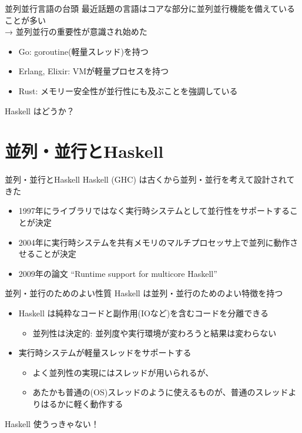 \documentclass[unicode,12pt]{beamer}
\begin{document}
\begin{frame}{並列並行言語の台頭}
  最近話題の言語はコアな部分に並列並行機能を備えていることが多い \\
  → 並列並行の重要性が意識され始めた
  \begin{itemize}
  \item Go: goroutine(軽量スレッド)を持つ
  \item Erlang, Elixir: VMが軽量プロセスを持つ
  \item Rust: メモリー安全性が並行性にも及ぶことを強調している
  \end{itemize}
  Haskell はどうか？
\end{frame}

\section{並列・並行とHaskell}

\begin{frame}{並列・並行とHaskell}
  Haskell (GHC) は古くから並列・並行を考えて設計されてきた
  \begin{itemize}
  \item 1997年にライブラリではなく実行時システムとして並行性をサポートすることが決定
  \item 2004年に実行時システムを共有メモリのマルチプロセッサ上で並列に動作させることが決定
  \item 2009年の論文 ``Runtime support for multicore Haskell''
  \end{itemize}
\end{frame}

\begin{frame}{並列・並行のためのよい性質}
  Haskell は並列・並行のためのよい特徴を持つ
  \begin{itemize}
  \item Haskell は純粋なコードと副作用(IOなど)を含むコードを分離できる
    \begin{itemize}
    \item 並列性は\alert{決定的}: 並列度や実行環境が変わろうと結果は変わらない
    \end{itemize}
  \item 実行時システムが\alert{軽量スレッド}をサポートする
    \begin{itemize}
    \item よく並列性の実現にはスレッドが用いられるが、
    \item あたかも普通の(OS)スレッドのように使えるものが、普通のスレッドよりはるかに軽く動作する
    \end{itemize}
  \end{itemize}
  Haskell 使うっきゃない！
\end{frame}
\end{document}
